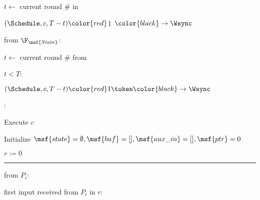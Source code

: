 \begin{bbox}[title={Subroutine {\bf ExecuteWithTimeout} $(c, T)$}]

$t \leftarrow$ current round \# in \Wsync

\Send $(\Schedule, c, T-t) \color{red} $1 \token$ \color{black} \rightarrow \Wsync$

\OnInput {} from $\F_{\msf{State}}$:

\quad $t \leftarrow$ current round \# from \Wsync
\begin{renumerate}
\item \If $t < T$:
	
	\qquad \Send $(\Schedule, c, T-t) \color{red} 1 \token \color{black} \rightarrow \Wsync$

\item \Else:
	
	\qquad Execute $c$

\end{renumerate}

\end{bbox}


\begin{bbox}[title={Functionality $\F_{\msf{State}} (\Delta, U, C, \mathcal{P} = \{P_1,...,P_n\}$}]

Initialize $\msf{state} = \emptyset, \msf{buf} = [], \msf{aux\_in} = [], \msf{ptr} = 0$

$r := 0$

\vspace{2mm} \hrule \vspace{2mm}


\OnInput {} from $P_i$:

\quad \If first input received from $P_i$ in $r$:

\begin{renumerate}
	\item \If 
\end{renumerate}

\end{bbox}
